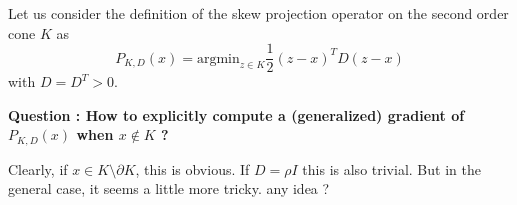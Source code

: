 \documentclass[a4]{article}
\begin{document}
Let us consider the definition of the skew projection operator on the second order cone $K$  as 
\begin{equation}
  P_{K,D} (x)  = \mbox{argmin}_{z \in K} \frac 1 2 (z-x)^T D (z-x)
\end{equation}
with $D=D^T>0$.

\textbf{Question : How to explicitly compute a (generalized) gradient of  $P_{K,D} (x)$ when $x \notin K$ ?}

Clearly, if $x \in K \setminus \partial K$, this is obvious.  If $D = \rho I$ this is also trivial. But in the general case, it seems a little more tricky. any idea ?



\end{document}
